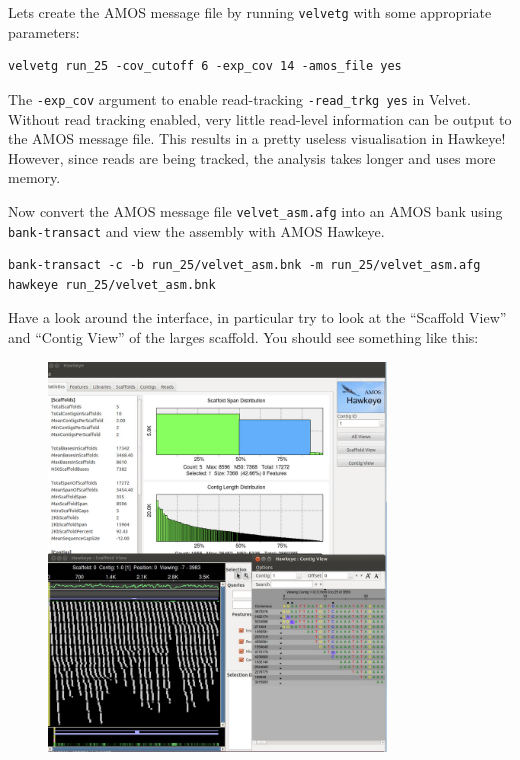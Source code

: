 \begin{steps}
Lets create the AMOS message file by running \texttt{velvetg} with some
appropriate parameters:
\begin{lstlisting}
velvetg run_25 -cov_cutoff 6 -exp_cov 14 -amos_file yes
\end{lstlisting}

\begin{note}
The \texttt{-exp\_cov} argument to enable read-tracking \texttt{-read\_trkg yes} in Velvet.
Without read tracking enabled, very little read-level information can be output
to the AMOS message file. This results in a pretty useless visualisation in
Hawkeye! However, since reads are being tracked, the analysis takes longer and
uses more memory.
\end{note}

Now convert the AMOS message file \texttt{velvet\_asm.afg} into an AMOS bank
using \texttt{bank-transact} and view the assembly with AMOS Hawkeye.
\begin{lstlisting}
bank-transact -c -b run_25/velvet_asm.bnk -m run_25/velvet_asm.afg
hawkeye run_25/velvet_asm.bnk
\end{lstlisting}

Have a look around the interface, in particular try to look at the ``Scaffold
View'' and ``Contig View'' of the larges scaffold. You should see something like
this:

\begin{figure}[H]
\centering
\includegraphics[width=0.8\textwidth]{handout/velvet/hawkeye_single_ended.png}
\caption{\label{fig:hawkeye_single_ended}}
\end{figure}

\end{steps}

